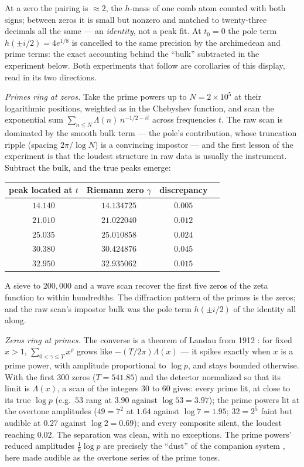\documentclass[11pt]{article}
\theoremstyle{remark}
\begin{document}
\noindent At a zero the pairing is $\approx 2$, the $h$-mass of one comb atom counted with both
signs; between zeros it is small but nonzero and matched to twenty-three decimals all the same
--- an \emph{identity}, not a peak fit. At $t_0 = 0$ the pole term $h(\pm i/2) = 4e^{1/8}$ is
cancelled to the same precision by the archimedean and prime terms: the exact accounting behind
the ``bulk'' subtracted in the experiment below. Both experiments that follow are corollaries of
this display, read in its two directions.

\emph{Primes ring at zeros.} Take the prime powers up to $N = 2 \times 10^5$ at their logarithmic
positions, weighted as in the Chebyshev function, and scan the exponential sum
$\sum_{n \le N} \Lambda(n)\, n^{-1/2 - it}$ across frequencies $t$. The raw scan is dominated by the
smooth bulk term --- the pole's contribution, whose truncation ripple (spacing $2\pi/\log N$) is a
convincing impostor --- and the first lesson of the experiment is that the loudest structure in raw
data is usually the instrument. Subtract the bulk, and the true peaks emerge:

\begin{center}
\begin{tabular}{cccc}
\hline
peak located at $t$ & Riemann zero $\gamma$ & discrepancy \\
\hline
$14.140$ & $14.134725$ & $0.005$ \\
$21.010$ & $21.022040$ & $0.012$ \\
$25.035$ & $25.010858$ & $0.024$ \\
$30.380$ & $30.424876$ & $0.045$ \\
$32.950$ & $32.935062$ & $0.015$ \\
\hline
\end{tabular}
\end{center}

\noindent A sieve to $200{,}000$ and a wave scan recover the first five zeros of the zeta function to
within hundredths. The diffraction pattern of the primes is the zeros; and the raw scan's impostor
bulk was the pole term $h(\pm i/2)$ of the identity all along.

\emph{Zeros ring at primes.} The converse is a theorem of Landau from 1912 \cite{LandauZeros}: for
fixed $x > 1$, $\sum_{0 < \gamma \le T} x^{\rho}$ grows like $-(T/2\pi)\Lambda(x)$ --- it spikes
exactly when $x$ is a prime power, with amplitude proportional to $\log p$, and stays bounded
otherwise. With the first $300$ zeros ($T = 541.85$) and the detector normalized so that its limit is
$\Lambda(x)$, a scan of the integers $30$ to $60$ gives: every prime lit, at close to its true
$\log p$ (e.g.\ $53$ rang at $3.90$ against $\log 53 = 3.97$); the prime powers lit at the overtone
amplitudes ($49 = 7^2$ at $1.64$ against $\log 7 = 1.95$; $32 = 2^5$ faint but audible at $0.27$
against $\log 2 = 0.69$); and every composite silent, the loudest reaching $0.02$. The separation was
clean, with no exceptions. The prime powers' reduced amplitudes $\tfrac1k \log p$ are precisely the
``dust'' of the companion system \cite{CompanionI}, here made audible as the overtone series of the
prime tones.
\end{document}
